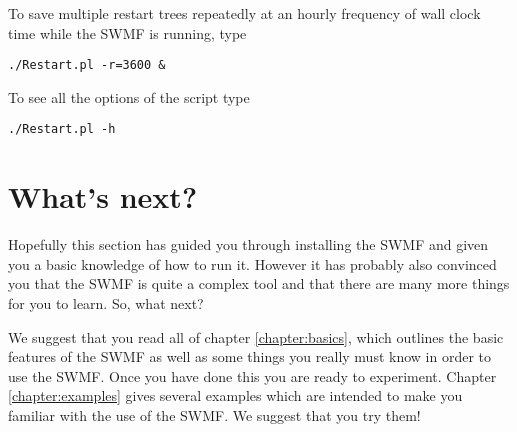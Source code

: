 To save multiple restart trees repeatedly at an hourly frequency of 
wall clock time while the SWMF is running, type
\begin{verbatim}
./Restart.pl -r=3600 &
\end{verbatim}
To see all the options of the script type
\begin{verbatim}
./Restart.pl -h
\end{verbatim}

\section{What's next?}

Hopefully this section has guided you through installing the SWMF and
given you a basic knowledge of how to run it.  However it has probably
also convinced you that the SWMF is quite a complex tool and that there
are many more things for you to learn.  So, what next?

We suggest that you read all of chapter \ref{chapter:basics}, which
outlines the basic features of the SWMF as well as some things you
really must know in order to use the SWMF.  Once you have done this you
are ready to experiment.  Chapter \ref{chapter:examples} gives several 
examples which are intended to make you familiar with the use of the SWMF.
We suggest that you try them!

%
